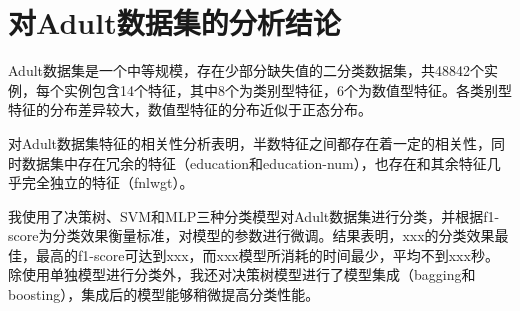 \documentclass[12pt,a4paper]{article}
\theoremstyle{definition}
\begin{document}

\section{对Adult数据集的分析结论}

Adult数据集是一个中等规模，存在少部分缺失值的二分类数据集，共48842个实例，每个实例包含14个特征，其中8个为类别型特征，6个为数值型特征。各类别型特征的分布差异较大，数值型特征的分布近似于正态分布。

\vspace{0.01\linewidth}
对Adult数据集特征的相关性分析表明，半数特征之间都存在着一定的相关性，同时数据集中存在冗余的特征（education和education-num），也存在和其余特征几乎完全独立的特征（fnlwgt）。

\vspace{0.01\linewidth}
我使用了决策树、SVM和MLP三种分类模型对Adult数据集进行分类，并根据f1-score为分类效果衡量标准，对模型的参数进行微调。结果表明，xxx的分类效果最佳，最高的f1-score可达到xxx，而xxx模型所消耗的时间最少，平均不到xxx秒。除使用单独模型进行分类外，我还对决策树模型进行了模型集成（bagging和boosting），集成后的模型能够稍微提高分类性能。
\end{document}
